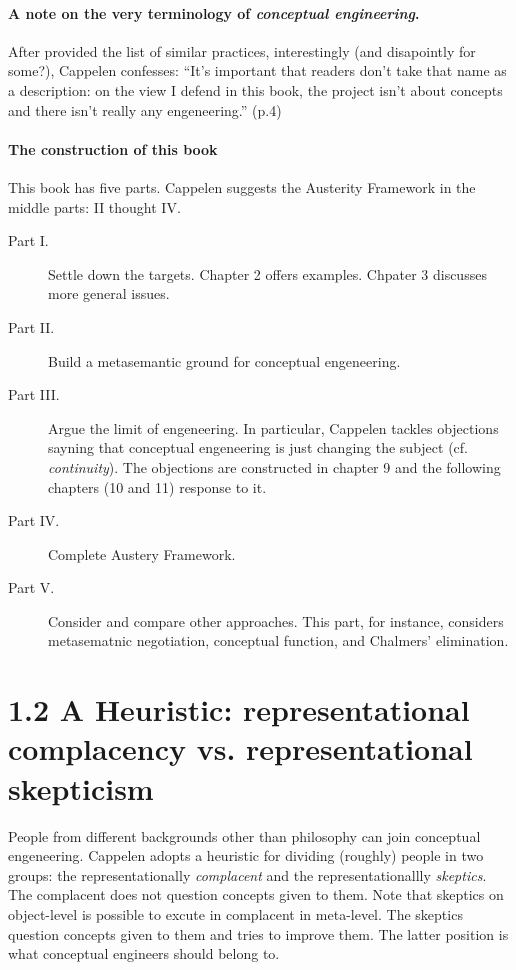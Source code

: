 \documentclass[
10pt, %
a4paper, %
twocolumn, %
landscape %
]{article}
\begin{document}
\paragraph{A note on the very terminology of \emph{conceptual engineering}. }
After provided the list of similar practices, interestingly (and disapointly for some?), Cappelen confesses:
``It's important that readers don't take that name as a description: on the view I defend in this book, the project isn't about concepts and there isn't really any engeneering.'' (p.4)

\paragraph{The construction of this book}
This book has five parts. Cappelen suggests the Austerity Framework in the middle parts: II thought IV.

\begin{description}
\item[Part I.] Settle down the targets.
Chapter 2 offers examples. Chpater 3 discusses more general issues.
\item[Part II.] Build a metasemantic ground for conceptual engeneering.
\item[Part III.] Argue the limit of engeneering.
In particular, Cappelen tackles objections sayning that conceptual engeneering is just changing the subject (cf. \emph{continuity}).
The objections are constructed in chapter 9 and the following chapters (10 and 11) response to it.
\item[Part IV.] Complete Austery Framework.
\item[Part V.] Consider and compare other approaches.
This part, for instance, considers metasematnic negotiation, conceptual function, and Chalmers' elimination.
\end{description}


\section*{1.2 A Heuristic: representational complacency vs. representational skepticism}

People from different backgrounds other than philosophy can join conceptual engeneering. Cappelen adopts a heuristic for dividing (roughly) people in two groups: the representationally \emph{complacent} and the representationallly \emph{skeptics}.
The complacent does not question concepts given to them.
Note that skeptics on object-level is possible to excute in complacent in meta-level.
The skeptics question concepts given to them and tries to improve them. The latter position is what conceptual engineers should belong to.
\end{document}
